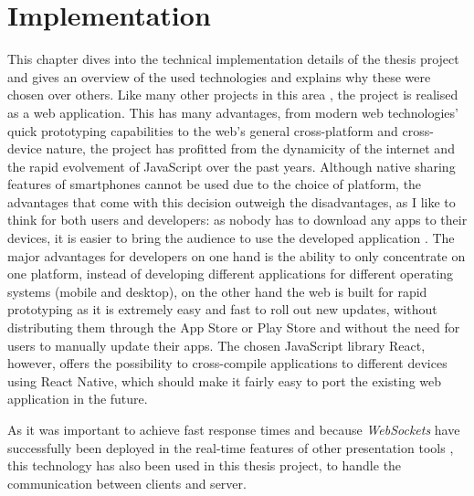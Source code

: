 \chapter{Implementation}
\label{cha:implementation}

This chapter dives into the technical implementation details of the thesis project and gives an overview of the used technologies and explains why these were chosen over others. Like many other projects in this area \cite{Bry:Backstage, Cheng:TreebasedOnlinePresentations, Esponda:ElectronicVotingOnTheFly, Inoue:RealTimeQuestionnaire, Teevan:MobileFeedbackDuringPresentation, Triglianos:InteractiveWebPresentationsImpress}, the project is realised as a web application. This has many advantages, from modern web technologies' quick prototyping capabilities to the web's general cross-platform and cross-device nature, the project has profitted from the dynamicity of the internet and the rapid evolvement of JavaScript over the past years.
Although native sharing features of smartphones cannot be used due to the choice of platform, the advantages that come with this decision outweigh the disadvantages, as I like to think for both users and developers: as nobody has to download any apps to their devices, it is easier to bring the audience to use the developed application \cite{Triglianos:InteractiveWebPresentationsImpress}. The major advantages for developers on one hand is the ability to only concentrate on one platform, instead of developing different applications for different operating systems (mobile and desktop), on the other hand the web is built for rapid prototyping as it is extremely easy and fast to roll out new updates, without distributing them through the App Store or Play Store and without the need for users to manually update their apps. The chosen JavaScript library React, however, offers the possibility to cross-compile applications to different devices using React Native, which should make it fairly easy to port the existing web application in the future.

As it was important to achieve fast response times and because \emph{WebSockets} have successfully been deployed in the real-time features of other presentation tools \cite{Inoue:RealTimeQuestionnaire, Triglianos:InteractiveWebPresentationsImpress}, this technology has also been used in this thesis project, to handle the communication between clients and server.


